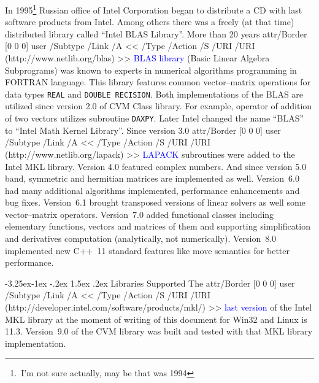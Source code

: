 \documentclass[12pt,letterpaper]{article}
\makeatletter
\newcommand{\URL}[2]{%
    \pdfstartlink attr{/Border [0 0 0]} user{%
    /Subtype /Link
    /A <<
        /Type /Action
        /S /URI
        /URI (#2)
    >>}%
\textcolor{blue}{#1}%
\pdfendlink}
\newcommand{\FORTRAN}{\textsf{FORTRAN}\xspace}
\newcommand{\CVMVERSION}{9.0\xspace}
\newcommand{\MKLVERSION}{11.3}
\renewcommand\subsection{\@startsection{subsection}{2}{0mm}%
                                     {-3.25ex\@plus -1ex \@minus -.2ex}%
                                     {1.5ex \@plus .2ex}%
                                     {\normalfont\large\bfseries\sffamily}}
\makeatother
\begin{document}
In 1995\footnote{\,I'm not sure actually, may be that was 1994}
Russian office of Intel Corporation began to distribute a CD with
last software products from Intel. Among others there was a freely
(at that time) distributed library called ``Intel BLAS Library''.
More than 20 years \URL{BLAS library}{http://www.netlib.org/blas}
(Basic Linear Algebra Subprograms) was known to experts in numerical
algorithms programming in \FORTRAN language. This library features
common vector--matrix operations for data types \verb"REAL" and
\verb"DOUBLE RECISION". 
Both implementations of the BLAS are utilized since version 2.0 of
CVM Class library. For example, operator of addition of two vectors
utilizes subroutine \verb"DAXPY". Later Intel changed the name
``BLAS'' to ``Intel Math Kernel Library''. Since version 3.0
\URL{LAPACK}{http://www.netlib.org/lapack} subroutines were
added to the Intel MKL library.
Version 4.0 featured complex numbers. And since version
5.0 band, symmetric and hermitian matrices are implemented as well.
Version~6.0 had many additional algorithms implemented, performance 
enhancements and bug fixes. Version~6.1 brought transposed versions of 
linear solvers as well some vec\-tor--matrix operators.
Version~7.0 added functional classes including elementary functions,
vectors and matrices of them and supporting simplification and
derivatives computation (analytically, not numerically).
Version~8.0 implemented new C++~11 standard features like move semantics 
for better performance.

\subsection{Libraries Supported}
The
\URL{last version}{http://developer.intel.com/software/products/mkl/} of the
Intel MKL library at the moment of writing of this document for Win32 and
Linux is \MKLVERSION. Version~\CVMVERSION of the CVM library was 
built and tested with that MKL library implementation.

\end{document}
